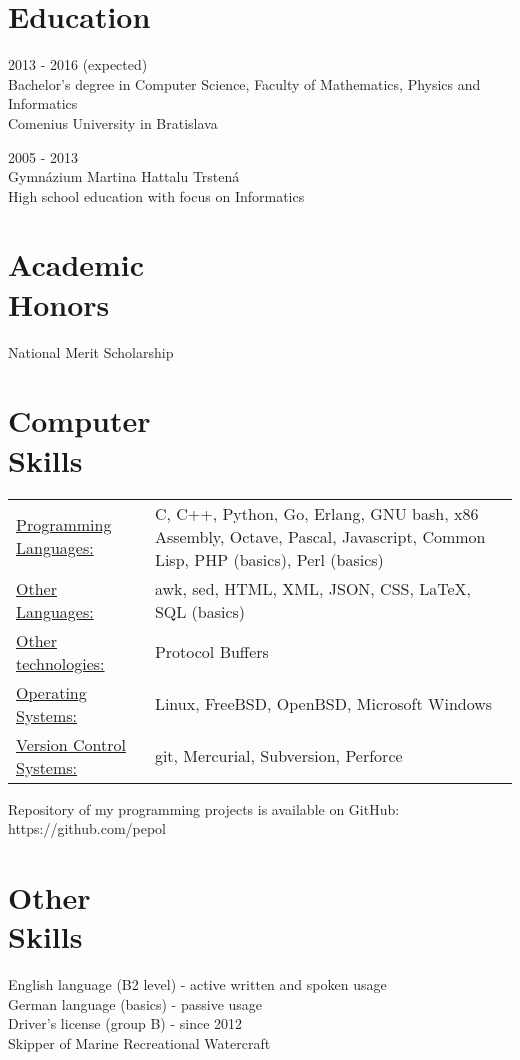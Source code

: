 \documentclass[margin]{res}
\begin{document}
\begin{resume}
\section{Education}
2013 - 2016 (expected) \\
Bachelor's degree in Computer Science, Faculty of Mathematics, Physics and Informatics \\
Comenius University in Bratislava

2005 - 2013 \\
Gymn\'{a}zium Martina Hattalu Trsten\'{a} \\
High school education with focus on Informatics

\section{Academic \\ Honors}
National Merit Scholarship

\section{Computer \\ Skills}
   \begin{tabular}{l p{3in}}
       \underline{Programming Languages:} & C, C++, Python, Go, Erlang, GNU bash, x86 Assembly, Octave, Pascal, Javascript, Common Lisp, PHP (basics), Perl (basics) \\
       \underline{Other Languages:} & awk, sed, HTML, XML, JSON, CSS, \LaTeX, SQL (basics) \\

       \underline{Other technologies:} & Protocol Buffers \\
       \underline{Operating Systems:} & Linux, FreeBSD, OpenBSD, Microsoft Windows \\
       \underline{Version Control Systems:} & git, Mercurial, Subversion, Perforce
 \end{tabular}

Repository of my programming projects is available on GitHub: https://github.com/pepol

\section{Other \\ Skills}
English language (B2 level) - active written and spoken usage \\
German language (basics) - passive usage \\
Driver's license (group B) - since 2012 \\
Skipper of Marine Recreational Watercraft


\end{resume}
\end{document}
